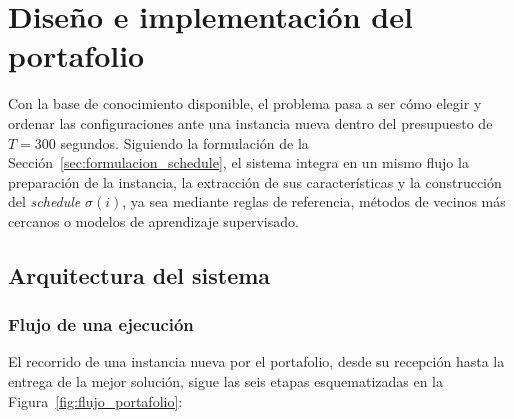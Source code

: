 \chapter{Diseño e implementación del portafolio}
\label{cap:portafolio}

Con la base de conocimiento disponible, el problema pasa a ser cómo elegir y
ordenar las configuraciones ante una instancia nueva dentro del presupuesto de
$T = 300$ segundos. Siguiendo la formulación de la
Sección~\ref{sec:formulacion_schedule}, el sistema integra en un mismo flujo la
preparación de la instancia, la extracción de sus características y la
construcción del \textit{schedule} $\sigma(i)$, ya sea mediante reglas de
referencia, métodos de vecinos más cercanos o modelos de aprendizaje
supervisado.

\section{Arquitectura del sistema}
\label{sec:arquitectura}

\subsection{Flujo de una ejecución}

El recorrido de una instancia nueva por el portafolio, desde su recepción hasta
la entrega de la mejor solución, sigue las seis etapas esquematizadas en la
Figura~\ref{fig:flujo_portafolio}:

